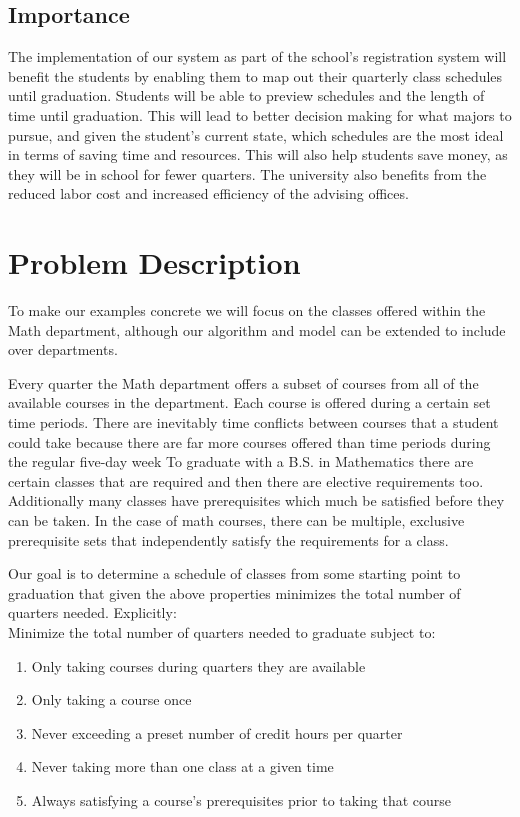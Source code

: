 \documentclass[11pt]{article} %
\begin{document}
\subsection{Importance} The implementation of our system as part of the school’s
registration system will benefit the students by enabling them to map out their
quarterly class schedules until graduation. Students will be able to preview
schedules and the length of time until graduation.  This will lead to better
decision making for what majors to pursue, and given the student's current
state, which schedules are the most ideal in terms of saving time and resources.
This will also help students save money, as they will be in school for fewer
quarters. The university also benefits from the reduced labor cost and increased
efficiency of the advising offices.

\section{Problem Description} To make our examples concrete we will focus on the
classes offered within the Math department, although our algorithm and model can
be extended to include over departments. 

Every quarter the Math department offers a subset of courses from all of the
available courses in the department. Each course is offered during a certain set
time periods. There are inevitably time conflicts between courses that a student
could take because there are far more courses offered than time periods during
the regular five-day week  To graduate with a B.S. in Mathematics there are
certain classes that are required and then there are elective requirements too.
Additionally many classes have prerequisites which much be satisfied before they
can be taken. In the case of math courses, there can be multiple, exclusive
prerequisite sets that independently satisfy the requirements for a class.

Our goal is to determine a schedule of classes from some starting point to
graduation that given the above properties minimizes the total number of
quarters needed. Explicitly: \\ Minimize the total
number of quarters needed to graduate subject to: \begin{enumerate} \item Only
taking courses during quarters they are available \item Only taking a course
once \item Never exceeding a preset number of credit hours per quarter \item
Never taking more than one class at a given time \item Always satisfying
a course's prerequisites prior to taking that course \end{enumerate}
\end{document}
